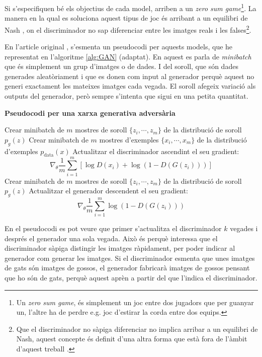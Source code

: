 Si s'especifiquen bé els objectius de cada model, arriben a un \textit{zero sum game}\footnote{Un \textit{zero sum game}, és simplement un joc entre dos jugadors que per guanyar un, l'altre ha de perdre e.g. joc d'estirar la corda entre dos equips.}. La manera en la qual es soluciona aquest tipus de joc és arribant a un equilibri de Nash \cite{QGAN_exp, GAN2014}, on el discriminador no sap diferenciar entre les imatges reals i les falses\footnote{Que el discriminador no sàpiga diferenciar no implica arribar a un equilibri de Nash, aquest concepte és definit d'una altra forma que està fora de l'àmbit d'aquest treball \cite{GAN2014}.}.

En l'article original \cite{GAN2014}, s'esmenta un pseudocodi per aquests models, que he representat en l'algoritme \ref{alg:GAN} (adaptat). En aquest es parla de \textit{minibatch} que és simplement un grup d'imatges o de dades. I del soroll, que són dades generades aleatòriament i que es donen com input al generador perquè aquest no generi exactament les mateixes imatges cada vegada. El soroll afegeix variació als outputs del generador, però sempre s'intenta que sigui en una petita quantitat.

\begin{algorithm}[H]
	\caption{\textbf{Pseudocodi per una xarxa generativa adversària}}\label{alg:GAN}
	\begin{algorithmic}
		\State Crear minibatch de $m$ mostres de soroll $\{z_i, \cdots, z_m\}$ de la distribució de soroll $p_g(z)$
		\State Crear minibatch de $m$ mostres d'exemples $\{x_i, \cdots, x_m\}$ de la distribució d'exemples $p_{\mathrm{data}}(x)$
		\State Actualitzar el discriminador ascendint el seu gradient: 
		$$
		\nabla_\theta \frac{1}{m}\sum_{i=1}^{m}\left[\log D(x_i) + \log(1- D(G(z_i)))\right]
		$$
		\EndFor
		\State Crear minibatch de $m$ mostres de soroll $\{z_i, \cdots, z_m\}$ de la distribució de soroll $p_g(z)$
		\State Actualitzar el generador descendent el seu gradient:
		$$
		\nabla_\theta \frac{1}{m} \sum_{i=1}^{m} \log(1-D(G(z_i)))
		$$
		\EndFor
	\end{algorithmic}

\end{algorithm}

En el pseudocodi es pot veure que primer s'actualitza el discriminador $k$ vegades i després  el generador una sola vegada. Això és perquè interessa que el discriminador sàpiga distingir les imatges ràpidament, per poder indicar al generador com generar les imatges. Si el discriminador esmenta que unes imatges de gats són imatges de gossos, el generador fabricarà imatges de gossos pensant que ho són de gats, perquè aquest aprèn a partir del que l'indica el discriminador.

